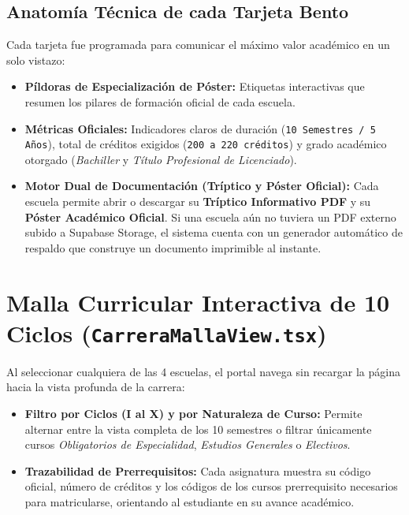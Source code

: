 \documentclass[12pt,a4paper,oneside]{report}
\begin{document}
\subsection{Anatomía Técnica de cada Tarjeta Bento}
Cada tarjeta fue programada para comunicar el máximo valor académico en un solo vistazo:
\begin{itemize}[leftmargin=1.0cm]
  \item \textbf{Píldoras de Especialización de Póster:} Etiquetas interactivas que resumen los pilares de formación oficial de cada escuela.
  \item \textbf{Métricas Oficiales:} Indicadores claros de duración (\texttt{10 Semestres / 5 Años}), total de créditos exigidos (\texttt{200 a 220 créditos}) y grado académico otorgado (\textit{Bachiller} y \textit{Título Profesional de Licenciado}).
  \item \textbf{Motor Dual de Documentación (Tríptico y Póster Oficial):} Cada escuela permite abrir o descargar su \textbf{Tríptico Informativo PDF} y su \textbf{Póster Académico Oficial}. Si una escuela aún no tuviera un PDF externo subido a Supabase Storage, el sistema cuenta con un generador automático de respaldo que construye un documento imprimible al instante.
\end{itemize}

\section{Malla Curricular Interactiva de 10 Ciclos (\texttt{CarreraMallaView.tsx})}
Al seleccionar cualquiera de las 4 escuelas, el portal navega sin recargar la página hacia la vista profunda de la carrera:
\begin{itemize}[leftmargin=1.0cm]
  \item \textbf{Filtro por Ciclos (I al X) y por Naturaleza de Curso:} Permite alternar entre la vista completa de los 10 semestres o filtrar únicamente cursos \textit{Obligatorios de Especialidad}, \textit{Estudios Generales} o \textit{Electivos}.
  \item \textbf{Trazabilidad de Prerrequisitos:} Cada asignatura muestra su código oficial, número de créditos y los códigos de los cursos prerrequisito necesarios para matricularse, orientando al estudiante en su avance académico.
\end{itemize}
\end{document}
